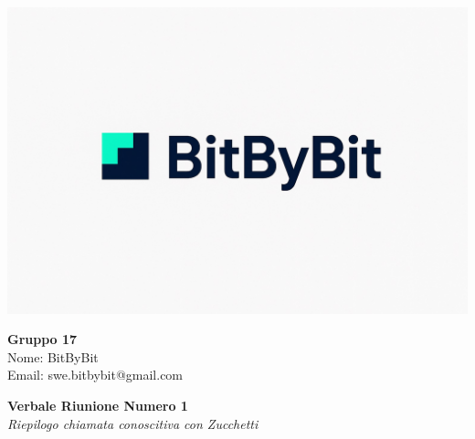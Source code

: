 \documentclass[a4paper,12pt]{article}
\begin{document}
\begin{center}
    \begin{minipage}{0.25\textwidth}
        \centering
        \includegraphics[width=\linewidth]{logo.png}
    \end{minipage}
    \hfill
    \begin{minipage}{0.7\textwidth}
        \raggedright
        {\LARGE \textbf{Gruppo 17}}\\[0.3cm]
        {\large
        Nome: BitByBit\\
        Email: swe.bitbybit@gmail.com
        }
    \end{minipage}
\end{center}

\vspace{1.5cm}

\begin{center}
    {\LARGE \textbf{Verbale Riunione Numero 1}}\\[0.2cm]
    {\large \textit{Riepilogo chiamata conoscitiva con Zucchetti}}
\end{center}

\vspace*{\fill}

\clearpage
\end{document}
